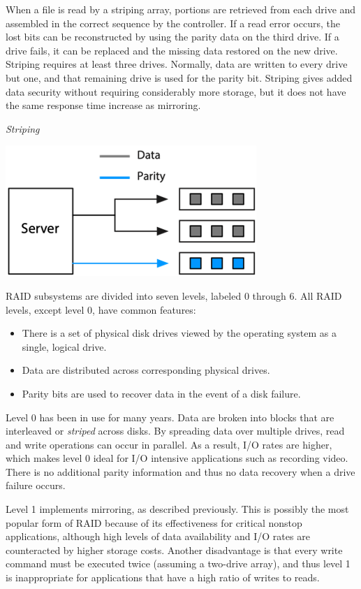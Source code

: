 \documentclass[
]{article}
\begin{document}
When a file is read by a striping array, portions are retrieved from
each drive and assembled in the correct sequence by the controller. If a
read error occurs, the lost bits can be reconstructed by using the
parity data on the third drive. If a drive fails, it can be replaced and
the missing data restored on the new drive. Striping requires at least
three drives. Normally, data are written to every drive but one, and
that remaining drive is used for the parity bit. Striping gives added
data security without requiring considerably more storage, but it does
not have the same response time increase as mirroring.

\emph{Striping}

\includegraphics{Figures/Chapter 20/striping.png}

RAID subsystems are divided into seven levels, labeled 0 through 6. All
RAID levels, except level 0, have common features:

\begin{itemize}
\item
  There is a set of physical disk drives viewed by the operating
  system as a single, logical drive.
\item
  Data are distributed across corresponding physical drives.
\item
  Parity bits are used to recover data in the event of a disk failure.
\end{itemize}

Level 0 has been in use for many years. Data are broken into blocks that
are interleaved or \emph{striped} across disks. By spreading data over
multiple drives, read and write operations can occur in parallel. As a
result, I/O rates are higher, which makes level 0 ideal for I/O
intensive applications such as recording video. There is no additional
parity information and thus no data recovery when a drive failure
occurs.

Level 1 implements mirroring, as described previously. This is possibly
the most popular form of RAID because of its effectiveness for critical
nonstop applications, although high levels of data availability and I/O
rates are counteracted by higher storage costs. Another disadvantage is
that every write command must be executed twice (assuming a two-drive
array), and thus level 1 is inappropriate for applications that have a
high ratio of writes to reads.
\end{document}
